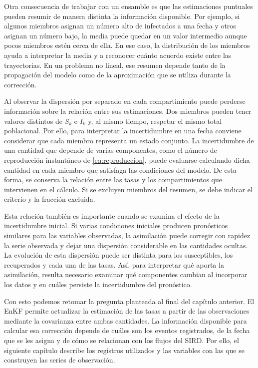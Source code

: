 Otra consecuencia de trabajar con un ensamble es que las estimaciones puntuales pueden resumir de manera distinta la información disponible. Por ejemplo, si algunos miembros asignan un número alto de infectados a una fecha y otros asignan un número bajo, la media puede quedar en un valor intermedio aunque pocos miembros estén cerca de ella. En ese caso, la distribución de los miembros ayuda a interpretar la media y a reconocer cuánto acuerdo existe entre las trayectorias. En un problema no lineal, ese resumen depende tanto de la propagación del modelo como de la aproximación que se utiliza durante la corrección.

Al observar la dispersión por separado en cada compartimiento puede perderse información sobre la relación entre sus estimaciones. Dos miembros pueden tener valores distintos de $S_k$ e $I_k$ y, al mismo tiempo, respetar el mismo total poblacional. Por ello, para interpretar la incertidumbre en una fecha conviene considerar que cada miembro representa un estado conjunto. La incertidumbre de una cantidad que depende de varias componentes, como el número de reproducción instantáneo de \eqref{eq:reproduccion}, puede evaluarse calculando dicha cantidad en cada miembro que satisfaga las condiciones del modelo. De esta forma, se conserva la relación entre las tasas y los compartimientos que intervienen en el cálculo. Si se excluyen miembros del resumen, se debe indicar el criterio y la fracción excluida.

Esta relación también es importante cuando se examina el efecto de la incertidumbre inicial. Si varias condiciones iniciales producen pronósticos similares para las variables observadas, la asimilación puede corregir con rapidez la serie observada y dejar una dispersión considerable en las cantidades ocultas. La evolución de esta dispersión puede ser distinta para los susceptibles, los recuperados y cada una de las tasas. Así, para interpretar qué aporta la asimilación, resulta necesario examinar qué componentes cambian al incorporar los datos y en cuáles persiste la incertidumbre del pronóstico.

Con esto podemos retomar la pregunta planteada al final del capítulo anterior. El EnKF permite actualizar la estimación de las tasas a partir de las observaciones mediante la covarianza entre ambas cantidades. La información disponible para calcular esa corrección depende de cuáles son los eventos registrados, de la fecha que se les asigna y de cómo se relacionan con los flujos del SIRD. Por ello, el siguiente capítulo describe los registros utilizados y las variables con las que se construyen las series de observación.


\label{fin:marco-teorico}
